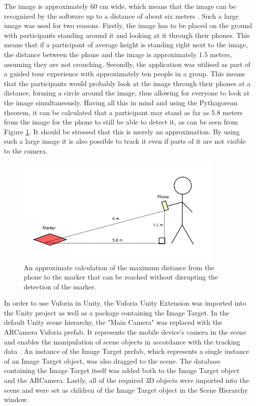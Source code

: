 The image is approximately 60 cm wide, which means that the image can be recognized by the software up to a distance of about six meters \cite{calculate_distance_from_image}. Such a large image was used for two reasons. Firstly, the image has to be placed on the ground with participants standing around it and looking at it through their phones. This means that if a participant of average height is standing right next to the image, the distance between the phone and the image is approximately 1.5 meters, assuming they are not crouching. Secondly, the application was utilised as part of a guided tour experience with approximately ten people in a group. This means that the participants would probably look at the image through their phones at a distance, forming a circle around the image, thus allowing for everyone to look at the image simultaneously. Having all this in mind and using the Pythagorean theorem, it can be calculated that a participant may stand as far as 5.8 meters from the image for the phone to still be able to detect it, as can be seen from Figure \ref{fig:imp3}. It should be stressed that this is merely an approximation. By using such a large image it is also possible to track it even if parts of it are not visible to the camera. 

\begin{figure}[h!]
    \centering
    \includegraphics[width=0.9\textwidth]{figures/imp3.png}
    \caption{An approximate calculation of the maximum distance from the phone to the marker that can be reached without disrupting the detection of the marker.}\label{fig:imp3}
\end{figure}

In order to use Vuforia in Unity, the Vuforia Unity Extension was imported into the Unity project as well as a package containing the Image Target. In the default Unity scene hierarchy, the "Main Camera" was replaced with the ARCamera Vuforia prefab. It represents the mobile device's camera in the scene and enables the manipulation of scene objects in accordance with the tracking data \cite{getting_started}. An instance of the Image Target prefab, which represents a single instance of an Image Target object, was also dragged to the scene. The database containing the Image Target itself was added both to the Image Target object and the ARCamera. Lastly, all of the required 3D objects were imported into the scene and were set as children of the Image Target object in the Scene Hierarchy window.



